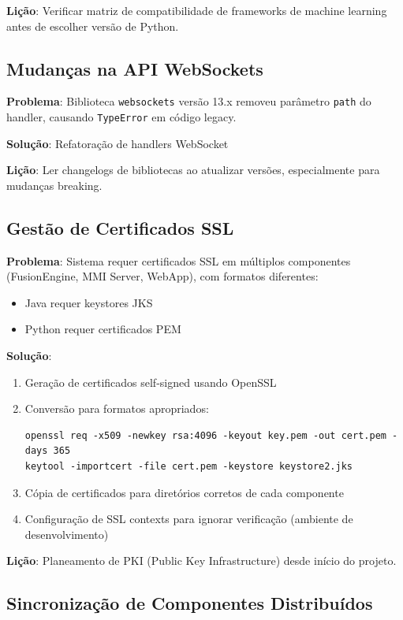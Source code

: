 \documentclass{report}
\begin{document}
\textbf{Lição}: Verificar matriz de compatibilidade de frameworks de machine learning antes de escolher versão de Python.

\subsection{Mudanças na API WebSockets}

\textbf{Problema}: Biblioteca \texttt{websockets} versão 13.x removeu parâmetro \texttt{path} do handler, causando \texttt{TypeError} em código legacy.

\textbf{Solução}: Refatoração de handlers WebSocket

\textbf{Lição}: Ler changelogs de bibliotecas ao atualizar versões, especialmente para mudanças breaking.

\subsection{Gestão de Certificados SSL}

\textbf{Problema}: Sistema requer certificados SSL em múltiplos componentes (FusionEngine, MMI Server, WebApp), com formatos diferentes:
\begin{itemize}
    \item Java requer keystores JKS
    \item Python requer certificados PEM
\end{itemize}

\textbf{Solução}:
\begin{enumerate}
    \item Geração de certificados self-signed usando OpenSSL
    \item Conversão para formatos apropriados:
    \begin{verbatim}
openssl req -x509 -newkey rsa:4096 -keyout key.pem -out cert.pem -days 365
keytool -importcert -file cert.pem -keystore keystore2.jks
    \end{verbatim}
    \item Cópia de certificados para diretórios corretos de cada componente
    \item Configuração de SSL contexts para ignorar verificação (ambiente de desenvolvimento)
\end{enumerate}

\textbf{Lição}: Planeamento de PKI (Public Key Infrastructure) desde início do projeto.

\subsection{Sincronização de Componentes Distribuídos}
\end{document}
